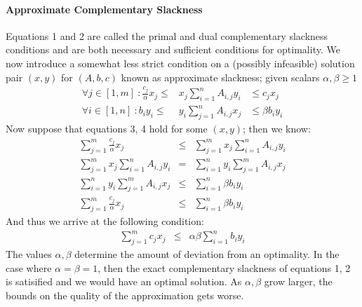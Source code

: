 \documentclass{article}
\begin{document}
\paragraph{Approximate Complementary Slackness}
Equations 1 and 2 are called the primal and dual complementary slackness conditions and are both necessary and sufficient conditions for optimality.  We now introduce a somewhat less strict condition on a (possibly infeasible) solution pair $(x,y)$ for $(A,b,c)$ known as approximate slackness; given scalars $\alpha, \beta \geq 1$
\begin{eqnarray}
\forall{ j \in [1, m] } \: : \frac{c_j}{ \alpha } x_j \leq &  x_j \sum \limits_{i=1}^n A_{i,j} y_i &  \leq c_j x_j \\
\forall{ i \in [1, n] } \: : b_i y_i \leq & y_i \sum \limits_{j=1}^n A_{i,j} x_j & \leq  \beta b_i y_i 
\end{eqnarray}
Now suppose that equations 3, 4 hold for some $(x,y)$; then we know:
\begin{eqnarray*}
\sum \limits_{j=1}^m \frac{c_j}{ \alpha } x_j & \leq &  \sum \limits_{j=1}^m x_j \sum \limits_{i=1}^n A_{i,j} y_i \\
\sum \limits_{j=1}^m x_j \sum \limits_{i=1}^n A_{i,j} y_i & = &  \sum \limits_{i=1}^n  y_i \sum \limits_{j=1}^m A_{i,j} x_j \\
\sum \limits_{i=1}^n  y_i \sum \limits_{j=1}^m A_{i,j} x_j & \leq &  \sum \limits_{i=1}^n \beta b_i y_i \\
\sum \limits_{j=1}^m \frac{c_j}{ \alpha } x_j & \leq & \sum \limits_{i=1}^n \beta b_i y_i
\end{eqnarray*}
And thus we arrive at the following condition:
\begin{eqnarray}
\sum \limits_{j=1}^m c_j x_j & \leq & \alpha \beta \sum \limits_{i=1}^n b_i y_i
\end{eqnarray}
The values $\alpha, \beta$ determine the amount of deviation from an optimality.  In the case where $\alpha = \beta = 1$, then the exact complementary slackness of equations 1, 2 is satisified and we would have an optimal solution.  As $\alpha, \beta$ grow larger, the bounds on the quality of the approximation gets worse.
\end{document}
